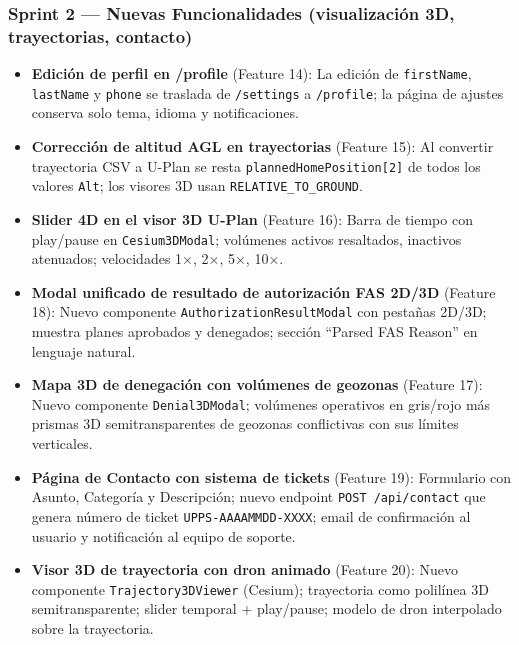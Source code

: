 \documentclass[12pt,a4paper]{article}
\begin{document}
\subsubsection*{Sprint 2 --- Nuevas Funcionalidades (visualización 3D, trayectorias, contacto)}
\begin{itemize}
    \item \textbf{Edición de perfil en /profile} (Feature 14): La edición de \texttt{firstName}, \texttt{lastName} y \texttt{phone} se traslada de \texttt{/settings} a \texttt{/profile}; la página de ajustes conserva solo tema, idioma y notificaciones.
    \item \textbf{Corrección de altitud AGL en trayectorias} (Feature 15): Al convertir trayectoria CSV a U-Plan se resta \texttt{plannedHomePosition[2]} de todos los valores \texttt{Alt}; los visores 3D usan \texttt{RELATIVE\_TO\_GROUND}.
    \item \textbf{Slider 4D en el visor 3D U-Plan} (Feature 16): Barra de tiempo con play/pause en \texttt{Cesium3DModal}; volúmenes activos resaltados, inactivos atenuados; velocidades 1×, 2×, 5×, 10×.
    \item \textbf{Modal unificado de resultado de autorización FAS 2D/3D} (Feature 18): Nuevo componente \texttt{AuthorizationResultModal} con pestañas 2D/3D; muestra planes aprobados y denegados; sección ``Parsed FAS Reason'' en lenguaje natural.
    \item \textbf{Mapa 3D de denegación con volúmenes de geozonas} (Feature 17): Nuevo componente \texttt{Denial3DModal}; volúmenes operativos en gris/rojo más prismas 3D semitransparentes de geozonas conflictivas con sus límites verticales.
    \item \textbf{Página de Contacto con sistema de tickets} (Feature 19): Formulario con Asunto, Categoría y Descripción; nuevo endpoint \texttt{POST /api/contact} que genera número de ticket \texttt{UPPS-AAAAMMDD-XXXX}; email de confirmación al usuario y notificación al equipo de soporte.
    \item \textbf{Visor 3D de trayectoria con dron animado} (Feature 20): Nuevo componente \texttt{Trajectory3DViewer} (Cesium); trayectoria como polilínea 3D semitransparente; slider temporal + play/pause; modelo de dron interpolado sobre la trayectoria.
\end{itemize}
\end{document}
